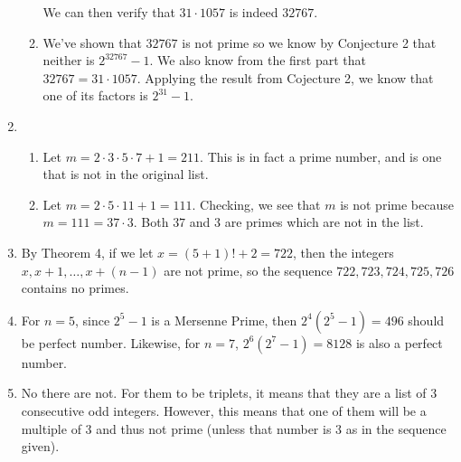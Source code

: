 \documentclass{article}
\begin{document}
\begin{enumerate}
\begin{enumerate}
    We can then verify that $31 \cdot 1057$ is indeed $32767$.
    \item We've shown that $32767$ is not prime so we know by Conjecture 2 that neither is $2^{32767} - 1$.  We also know from the first part that $32767=31 \cdot 1057$.  Applying the result from Cojecture 2, we know that one of its factors is $2^31 - 1$.
  \end{enumerate}
\item
  \begin{enumerate}
  \item Let $m = 2 \cdot 3 \cdot 5 \cdot 7 + 1 = 211$.  This is in fact a prime number, and is one that is not in the original list.
  \item Let $m = 2 \cdot 5 \cdot 11 + 1 = 111$.  Checking, we see that $m$ is not prime because $m=111=37 \cdot 3$.  Both $37$ and $3$ are primes which are not in the list.
  \end{enumerate}
\item By Theorem 4, if we let $x=(5+1)!+2=722$, then the integers $x,x+1,\ldots,x+(n-1)$ are not prime, so the sequence $722, 723, 724, 725, 726$ contains no primes.
\item For $n=5$, since $2^5 - 1$ is a Mersenne Prime, then $2^4(2^5 - 1)=496$ should be perfect number.  Likewise, for $n=7$, $2^6(2^7-1)=8128$ is also a perfect number.
\item No there are not.  For them to be triplets, it means that they are a list of 3 consecutive odd integers.  However, this means that one of them will be a multiple of 3 and thus not prime (unless that number is $3$ as in the sequence given).
\end{enumerate}
\end{document}
